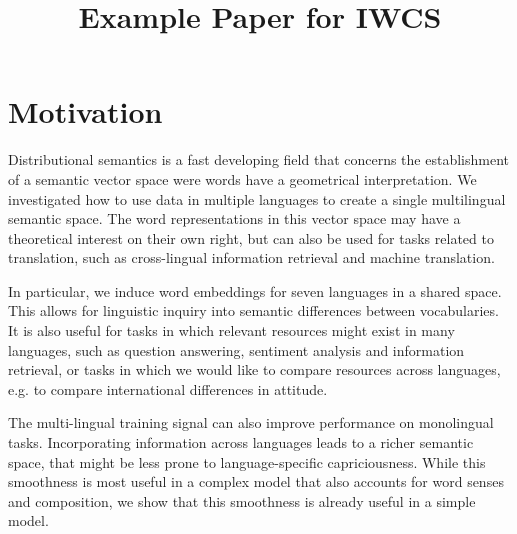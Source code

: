 \documentclass[a4paper,11pt]{article}
\title{Example Paper for IWCS}
\date{}
\begin{document}
\maketitle
\thispagestyle{empty}
\pagestyle{empty}

\section*{Motivation}

Distributional semantics is a fast developing field that concerns the establishment of a semantic vector space were words have a geometrical interpretation. We investigated how to use data in multiple languages to create a single multilingual semantic space. The word representations in this vector space may have a theoretical interest on their own right, but can also be used for tasks related to translation, such as cross-lingual information retrieval and machine translation. 

In particular, we induce word embeddings for seven languages in a shared space.  This allows for linguistic inquiry into semantic differences between vocabularies. It is also useful for tasks in which relevant resources might exist in many languages, such as question answering, sentiment analysis and information retrieval, or tasks in which we would like to compare resources across languages, e.g. to compare international differences in attitude.

The multi-lingual training signal can also improve performance on monolingual tasks. Incorporating information across languages leads to a richer semantic space, that might be less prone to language-specific capriciousness. While this smoothness is most useful in a complex model that also accounts for word senses and composition, we show that this smoothness is already useful in a simple model.

\end{document}
